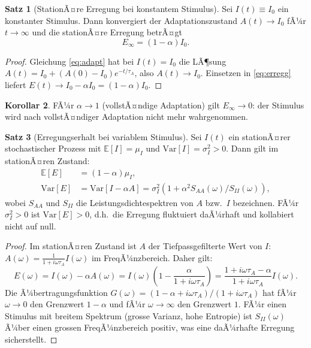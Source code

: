 ﻿\documentclass[12pt,a4paper]{article}
\theoremstyle{definition}
\newtheorem{theorem}{Satz}[section]
\newtheorem{corollary}[theorem]{Korollar}
\newcommand{\E}{\mathbb{E}}
\newcommand{\Var}{\mathrm{Var}}
\begin{document}
\begin{theorem}[StationÃ¤re Erregung bei konstantem Stimulus]
Sei $I(t) \equiv I_0$ ein konstanter Stimulus. Dann konvergiert der
Adaptationszustand $A(t) \to I_0$ fÃ¼r $t \to \infty$ und die
stationÃ¤re Erregung betrÃ¤gt
\[
  E_\infty = (1 - \alpha) I_0.
\]
\end{theorem}

\begin{proof}
Gleichung \eqref{eq:adapt} hat bei $I(t) = I_0$ die LÃ¶sung
$A(t) = I_0 + (A(0) - I_0)e^{-t/\tau_A}$, also $A(t) \to I_0$.
Einsetzen in \eqref{eq:erregg} liefert $E(t) \to I_0 - \alpha I_0 = (1-\alpha) I_0$.
\end{proof}

\begin{corollary}
FÃ¼r $\alpha \to 1$ (vollstÃ¤ndige Adaptation) gilt $E_\infty \to 0$:
der Stimulus wird nach vollstÃ¤ndiger Adaptation nicht mehr wahrgenommen.
\end{corollary}

\begin{theorem}[Erregungserhalt bei variablem Stimulus]\label{thm:erregungserhalt}
Sei $I(t)$ ein stationÃ¤rer stochastischer Prozess mit $\E[I] = \mu_I$
und $\Var[I] = \sigma_I^2 > 0$. Dann gilt im stationÃ¤ren Zustand:
\begin{align}
  \E[E] &= (1 - \alpha)\mu_I, \\
  \Var[E] &= \Var[I - \alpha A]
           = \sigma_I^2\left(1 + \alpha^2 S_{AA}(\omega) / S_{II}(\omega)\right),
\end{align}
wobei $S_{AA}$ und $S_{II}$ die Leistungsdichtespektren von $A$ bzw.\ $I$
bezeichnen. FÃ¼r $\sigma_I^2 > 0$ ist $\Var[E] > 0$, d.h.\
die Erregung fluktuiert daÃ¼rhaft und kollabiert nicht auf null.
\end{theorem}

\begin{proof}
Im stationÃ¤ren Zustand ist $A$ der Tiefpassgefilterte Wert von $I$:
$A(\omega) = \frac{1}{1 + i\omega\tau_A} I(\omega)$ im FreqÃ¼nzbereich.
Daher gilt:
\[
  E(\omega) = I(\omega) - \alpha A(\omega)
  = I(\omega)\left(1 - \frac{\alpha}{1 + i\omega\tau_A}\right)
  = \frac{1 + i\omega\tau_A - \alpha}{1 + i\omega\tau_A} I(\omega).
\]
Die Ã¼bertragungsfunktion $G(\omega) = (1 - \alpha + i\omega\tau_A)/(1 + i\omega\tau_A)$
hat fÃ¼r $\omega \to 0$ den Grenzwert $1 - \alpha$ und fÃ¼r
$\omega \to \infty$ den Grenzwert $1$. FÃ¼r einen Stimulus mit
breitem Spektrum (grosse Varianz, hohe Entropie) ist $S_{II}(\omega)$
Ã¼ber einen grossen FreqÃ¼nzbereich positiv, was eine daÃ¼rhafte Erregung
sicherstellt.
\end{proof}
\end{document}
